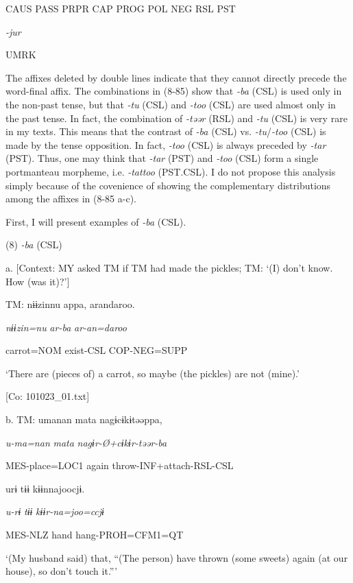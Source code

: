     CAUS  PASS  PRPR  CAP  PROG  POL  NEG  RSL  PST  

          \textit{{}-jur} 

          UMRK    

The affixes deleted by double lines indicate that they cannot directly precede the word-final affix. The combinations in (8-85) show that \textit{{}-ba} (CSL) is used only in the non-past tense, but that \textit{{}-tu} (CSL) and \textit{{}-too} (CSL) are used almost only in the past tense. In fact, the combination of \textit{{}-təər} (RSL) and \textit{{}-tu} (CSL) is very rare in my texts. This means that the contrast of \textit{{}-ba} (CSL) vs. \textit{{}-tu}/\textit{{}-too} (CSL) is made by the tense opposition. In fact, \textit{-too} (CSL) is always preceded by \textit{{}-tar} (PST). Thus, one may think that \textit{{}-tar} (PST) and \textit{{}-too} (CSL) form a single portmanteau morpheme, i.e. \textit{{}-tattoo} (PST.CSL). I do not propose this analysis simply because of the covenience of showing the complementary distributions among the affixes in (8-85 a-c).

  First, I will present examples of \textit{{}-ba} (CSL).

(8)  \textit{{}-ba} (CSL)

  a.  [Context: MY asked TM if TM had made the pickles; TM: ‘(I) don’t know. How (was it)?’]

    TM:  nɨɨzinnu  appa,  arandaroo.

      \textit{nɨɨzin=nu}  \textit{ar-ba}  \textit{ar-an=daroo}

      carrot=NOM  exist-CSL  COP-NEG=SUPP

      ‘There are (pieces of) a carrot, so maybe (the pickles) are not (mine).’

      [Co: 101023\_01.txt]

  b.  TM:  umanan  mata  nagɨcɨkɨtəəppa,

      \textit{u-ma=nan}  \textit{mata}  \textit{nagɨr-Ø+cɨkɨr-təər-ba}

      MES-place=LOC1  again  throw-INF+attach-RSL-CSL

      urɨ  tɨɨ  kɨɨnnajoocjɨ.

      \textit{u-rɨ}  \textit{tɨɨ}  \textit{kɨɨr-na=joo=ccjɨ}

      MES-NLZ  hand  hang-PROH=CFM1=QT

      ‘(My husband said) that, “(The person) have thrown (some sweets) again (at our house), so don’t touch it.”’

